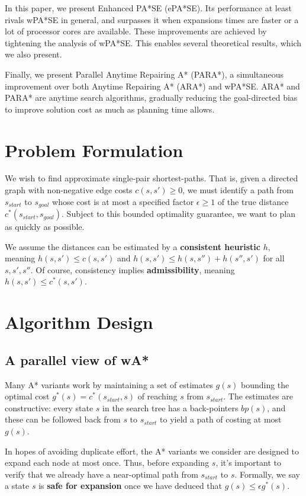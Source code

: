 \documentclass[letterpaper]{article}
\begin{document}
In this paper, we present Enhanced PA*SE (ePA*SE). Its performance at least rivals wPA*SE in general, and surpasses it when expansions times are faster or a lot of processor cores are available. These improvements are achieved by tightening the analysis of wPA*SE. This enables several theoretical results, which we also present.

Finally, we present  Parallel Anytime Repairing A* (PARA*), a simultaneous improvement over both Anytime Repairing A* (ARA*) and wPA*SE. ARA* and PARA* are anytime search algorithms, gradually reducing the goal-directed bias to improve solution cost as much as planning time allows.

\section{Problem Formulation}

We wish to find approximate single-pair shortest-paths. That is, given a directed graph with non-negative edge costs $c(s,s') \ge 0$, we must identify a path from $s_{start}$ to $s_{goal}$ whose cost is at most a specified factor $\epsilon\ge 1$ of the true distance $c^*(s_{start},s_{goal})$. Subject to this bounded optimality guarantee, we want to plan as quickly as possible.

We assume the distances can be estimated by a \textbf{consistent heuristic} $h$, meaning $h(s,s')\le c(s,s')$ and $h(s,s')\le h(s,s'') + h(s'',s')$ for all $s,s',s''$. Of course, consistency implies \textbf{admissibility}, meaning $h(s,s')\le c^*(s,s')$.

\section{Algorithm Design}

\subsection{A parallel view of wA*}

Many A* variants work by maintaining a set of estimates $g(s)$ bounding the optimal cost $g^*(s) = c^*(s_{start},s)$ of reaching $s$ from $s_{start}$. The estimates are constructive: every state $s$ in the search tree has a back-pointers $bp(s)$, and these can be followed back from $s$ to $s_{start}$ to yield a path of costing at most $g(s)$.

In hopes of avoiding duplicate effort, the A* variants we consider are designed to expand each node at most once. Thus, before expanding $s$, it's important to verify that we already have a near-optimal path from $s_{start}$ to $s$. Formally, we say a state $s$ is \textbf{safe for expansion} once we have deduced that $g(s) \le \epsilon g^*(s)$.
\end{document}
